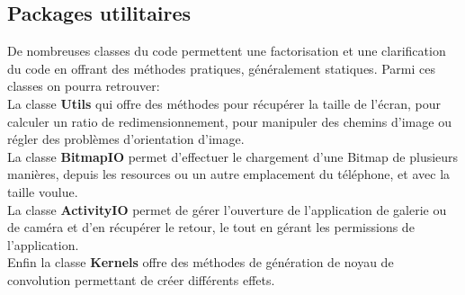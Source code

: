 \subsection{Packages utilitaires}
De nombreuses classes du code permettent une factorisation et une clarification du code en offrant des méthodes pratiques, généralement statiques. Parmi ces classes on pourra retrouver:
\\

La classe \textbf{Utils} qui offre des méthodes pour récupérer la taille de l'écran, pour calculer un ratio de redimensionnement, pour manipuler des chemins d'image ou régler des problèmes d'orientation d'image.
\\

La classe \textbf{BitmapIO} permet d'effectuer le chargement d'une Bitmap de plusieurs manières, depuis les resources ou un autre emplacement du téléphone, et avec la taille voulue.
\\

La classe \textbf{ActivityIO} permet de gérer l'ouverture de l'application de galerie ou de caméra et d'en récupérer le retour, le tout en gérant les permissions de l'application.
\\

Enfin la classe \textbf{Kernels} offre des méthodes de génération de noyau de convolution permettant de créer différents effets.
